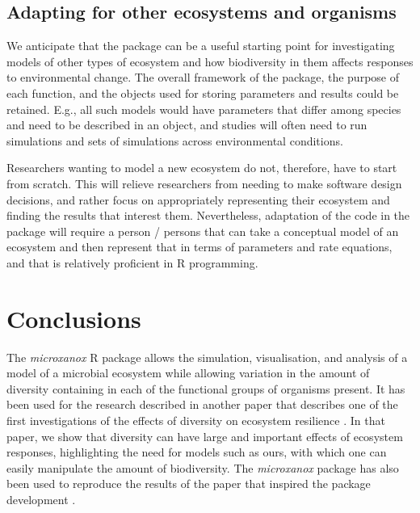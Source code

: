 \documentclass[]{elsarticle} %
\begin{document}
\hypertarget{adapting-for-other-ecosystems-and-organisms}{%
\subsection{Adapting for other ecosystems and
organisms}\label{adapting-for-other-ecosystems-and-organisms}}

We anticipate that the package can be a useful starting point for
investigating models of other types of ecosystem and how biodiversity in
them affects responses to environmental change. The overall framework of
the package, the purpose of each function, and the objects used for
storing parameters and results could be retained. E.g., all such models
would have parameters that differ among species and need to be described
in an object, and studies will often need to run simulations and sets of
simulations across environmental conditions.

Researchers wanting to model a new ecosystem do not, therefore, have to
start from scratch. This will relieve researchers from needing to make
software design decisions, and rather focus on appropriately
representing their ecosystem and finding the results that interest them.
Nevertheless, adaptation of the code in the package will require a
person / persons that can take a conceptual model of an ecosystem and
then represent that in terms of parameters and rate equations, and that
is relatively proficient in R programming.

\hypertarget{conclusions}{%
\section{Conclusions}\label{conclusions}}

The \emph{microxanox} R package allows the simulation, visualisation,
and analysis of a model of a microbial ecosystem while allowing
variation in the amount of diversity containing in each of the
functional groups of organisms present. It has been used for the
research described in another paper that describes one of the first
investigations of the effects of diversity on ecosystem resilience
\citet{Limberger2022}. In that paper, we show that diversity can have
large and important effects of ecosystem responses, highlighting the
need for models such as ours, with which one can easily manipulate the
amount of biodiversity. The \emph{microxanox} package has also been used
to reproduce the results of the paper that inspired the package
development \citep{Bush2017}.
\end{document}
